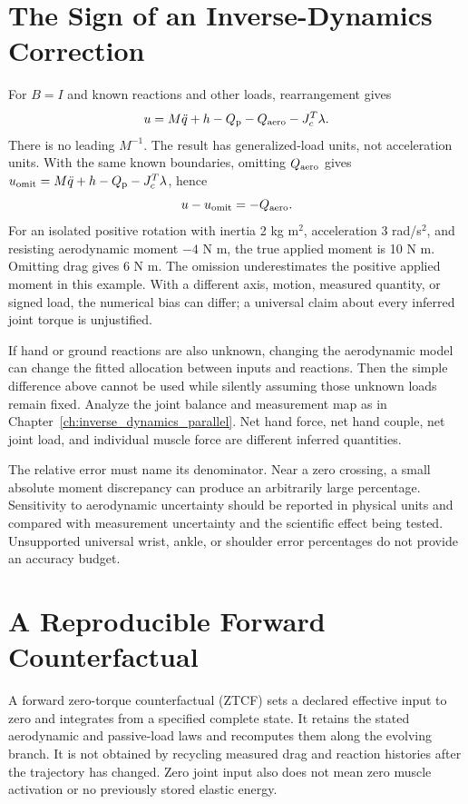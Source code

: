 \section{The Sign of an Inverse-Dynamics Correction}

For $B=I$ and known reactions and other loads, rearrangement gives
\begin{equation}
 u=M\ddot q+h-Q_{\mathrm{p}}-Q_{\rm aero}-J_c^T\lambda.
 \label{eq:inverse-dyn-full}
\end{equation}
There is no leading $M^{-1}$. The result has generalized-load units, not
acceleration units. With the same known boundaries, omitting $Q_{\rm aero}$
gives $u_{\rm omit}=M\ddot q+h-Q_{\mathrm{p}}-J_c^T\lambda$, hence
\begin{equation}
 u-u_{\rm omit}=-Q_{\rm aero}.
 \label{eq:inverse-dyn-error}
\end{equation}
For an isolated positive rotation with inertia 2 kg m$^2$, acceleration
3 rad/s$^2$, and resisting aerodynamic moment $-4$ N m, the true applied
moment is 10 N m. Omitting drag gives 6 N m. The omission underestimates the
positive applied moment in this example. With a different axis, motion,
measured quantity, or signed load, the numerical bias can differ; a universal
claim about every inferred joint torque is unjustified.

If hand or ground reactions are also unknown, changing the aerodynamic model
can change the fitted allocation between inputs and reactions. Then the simple
difference above cannot be used while silently assuming those unknown loads
remain fixed. Analyze the joint balance and measurement map as in
Chapter~\ref{ch:inverse_dynamics_parallel}. Net hand force, net hand couple,
net joint load, and individual muscle force are different inferred quantities.

The relative error must name its denominator. Near a zero crossing, a small
absolute moment discrepancy can produce an arbitrarily large percentage.
Sensitivity to aerodynamic uncertainty should be reported in physical units
and compared with measurement uncertainty and the scientific effect being
tested. Unsupported universal wrist, ankle, or shoulder error percentages do
not provide an accuracy budget.

\section{A Reproducible Forward Counterfactual}

A forward zero-torque counterfactual (ZTCF) sets a declared effective input to
zero and integrates from a specified complete state. It retains the stated
aerodynamic and passive-load laws and recomputes them along the evolving branch.
It is not obtained by recycling measured drag and reaction histories after the
trajectory has changed. Zero joint input also does not mean zero muscle
activation or no previously stored elastic energy.

